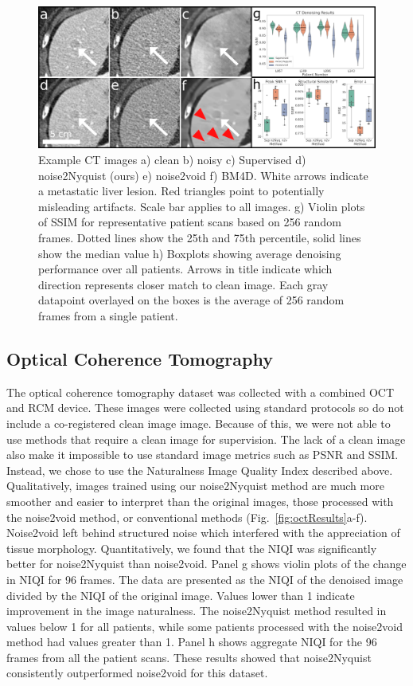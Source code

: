 \documentclass[journal,twoside,web]{ieeecolor}
\begin{document}
\begin{figure}[htb]
	\begin{center}
		\includegraphics[width=\textwidth]{ct/CTDenoisingFigure_ver02}
		\caption{\label{fig:ctResults}Example CT images a) clean b) noisy c) Supervised d) noise2Nyquist (ours) e) noise2void f) BM4D. White arrows indicate a metastatic liver lesion. Red triangles point to potentially misleading artifacts. Scale bar applies to all images. g) Violin plots of SSIM for representative patient scans based on 256 random frames. Dotted lines show the 25th and 75th percentile, solid lines show the median value h) Boxplots showing average denoising performance over all patients. Arrows in title indicate which direction represents closer match to clean image. Each gray datapoint overlayed on the boxes is the average of 256 random frames from a single patient.}
	\end{center}
\end{figure}

\subsection{Optical Coherence Tomography}

The optical coherence tomography dataset was collected with a combined OCT and RCM device\cite{Iftimia2017a}. These images were collected using standard protocols so do not include a co-registered clean image image. Because of this, we were not able to use methods that require a clean image for supervision. The lack of a clean image also make it impossible to use standard image metrics such as PSNR and SSIM. Instead, we chose to use the Naturalness Image Quality Index described above. Qualitatively, images trained using our noise2Nyquist method are much more smoother and easier to interpret than the original images, those processed with the noise2void method, or conventional methods (Fig.~\ref{fig:octResults}a-f). Noise2void left behind structured noise which interfered with the appreciation of tissue morphology. Quantitatively, we found that the NIQI was significantly better for noise2Nyquist than noise2void. Panel g shows violin plots of the change in NIQI for 96 frames. The data are presented as the NIQI of the denoised image divided by the NIQI of the original image. Values lower than 1 indicate improvement in the image naturalness. The noise2Nyquist method resulted in values below 1 for all patients, while some patients processed with the noise2void method had values greater than 1. Panel h shows aggregate NIQI for the 96 frames from all the patient scans. These results showed that noise2Nyquist consistently outperformed noise2void for this dataset.
\end{document}
